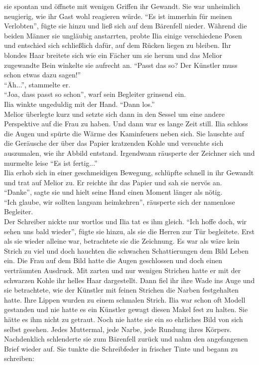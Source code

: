 sie spontan und öffnete mit wenigen Griffen ihr Gewandt. Sie war unheimlich neugierig, wie ihr Gast 
wohl reagieren würde. ``Es ist immerhin für meinen Verlobten'', fügte sie hinzu und ließ sich auf 
dem Bärenfell nieder. Während die beiden Männer sie ungläubig anstarrten, probte Ilia einige 
verschiedene Posen und entschied sich schließlich dafür, auf dem Rücken liegen zu bleiben. Ihr 
blondes Haar breitete sich wie ein Fächer um sie herum und das Melior zugewandte Bein winkelte sie 
aufrecht an. ``Passt das so? Der Künstler muss schon etwas dazu sagen!''\\
``Äh...'', stammelte er.\\
``Joa, dass passt so schon'', warf sein Begleiter grinsend ein.\\
Ilia winkte ungeduldig mit der Hand. ``Dann los.''\\
Melior überlegte kurz und setzte sich dann in den Sessel um eine andere Perspektive auf die Frau zu 
haben. Und dann war es lange Zeit still. Ilia schloss die Augen und spürte die Wärme des 
Kaminfeuers neben sich. Sie lauschte auf die Geräusche der über das Papier kratzenden Kohle und 
versuchte sich auszumalen, wie ihr Abbild entstand. Irgendwann räusperte der Zeichner sich und 
murmelte leise ``Es ist fertig...''\\
Ilia erhob sich in einer geschmeidigen Bewegung, schlüpfte schnell in ihr Gewandt und trat auf 
Melior zu. Er reichte ihr das Papier und sah sie nervös an.\\
``Danke'', sagte sie und hielt seine Hand einen Moment länger als nötig.\\
``Ich glaube, wir sollten langsam heimkehren'', räusperte sich der namenlose Begleiter.\\
Der Schreiber nickte nur wortlos und Ilia tat es ihm gleich. ``Ich hoffe doch, wir sehen uns bald 
wieder'', fügte sie hinzu, als sie die Herren zur Tür begleitete. Erst als sie wieder alleine war, 
betrachtete sie die Zeichnung. Es war als wäre kein Strich zu viel und doch hauchten die schwachen 
Schattierungen dem Bild Leben ein. Die Frau auf dem Bild hatte die Augen geschlossen und doch 
einen verträumten Ausdruck. Mit zarten und nur wenigen Strichen hatte er mit der schwarzen Kohle 
ihr helles Haar dargestellt. Dann fiel ihr ihre Wade ins Auge und sie betrachtete, wie der Künstler 
mit feinen Strichen die Narben festgehalten hatte. Ihre Lippen wurden zu einem schmalen Strich. Ilia 
war schon oft Modell gestanden und nie hatte es ein Künstler gewagt diesen Makel fest zu halten. Sie 
hätte es ihm nicht zu getraut. Noch nie hatte sie ein so ehrliches Bild von sich selbst gesehen. 
Jedes Muttermal, jede Narbe, jede Rundung ihres Körpers. Nachdenklich schlenderte sie zum Bärenfell 
zurück und nahm den angefangenen Brief wieder auf. Sie tunkte die Schreibfeder in frischer Tinte und 
begann zu schreiben:

